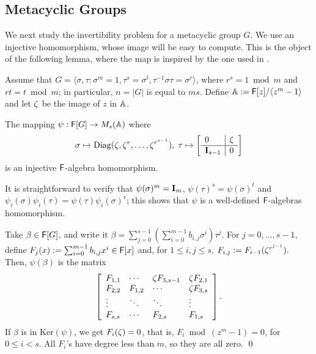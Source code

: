 \subsection{Metacyclic Groups}

We next study the invertibility problem for a
metacyclic group $G$. We use an injective homomorphism, whose image will
be easy to compute. This is the object of the following lemma, where
the map is inspired by the one used in \cite[\S 47]{Curtis}.

Assume that $G = \langle \sigma , \tau : \sigma^m = 1, \tau^s =
\sigma^t, \tau^{-1} \sigma \tau = \sigma^r \rangle$, where $r^s = 1
\bmod m$ and $rt = t \bmod m$; in particular, $n=|G|$ is equal to
$ms$. Define $\mathbb{A}:={\mathsf{F}}[z]/\langle z^m-1\rangle$ and let $\zeta$ be the
image of $z$ in $\mathbb{A}$.

\begin{lemma}\label{prop:metinjection}
The mapping $\psi: {\mathsf{F}} [G] \to M_s(\mathbb{A})$ where
\[
\sigma \mapsto \mathrm{Diag}(\zbar, \zbar^r , \ldots, \zbar^{r^{s-1}})
,\; \tau \mapsto 
\left[ \begin{array}{l|l}
0 & \zbar\\
\hline
\mat I_{s-1} & 0
\end{array}
\right]
\]
is an injective ${\mathsf{F}}$-algebra homomorphism.
\end{lemma}
It is straightforward to verify that $\psi(\sigma)^m = \mat I_m$,
$\psi(\tau)^s = \psi(\sigma)^t$ and $\psi_i(\sigma) \psi_i(\tau)
=\psi(\tau) \psi_i(\sigma)^r$; this shows that $\psi$ is a well-defined ${\mathsf{F}}$-algebras homomorphism.

Take $\beta \in {\mathsf{F}}[G]$, and write it $\beta = \sum_{j = 0}^{s-1}
\left( \sum_{i = 0}^{m-1} b_{i,j} \sigma^i \right) \tau^j$. For
$j=0,\dots,s-1$, define $F_j(x) := \sum_{i = 0}^{m-1} b_{i,j}x^i \in
{\mathsf{F}}[x]$ and, for $1 \leq i,j \leq s$,
$F_{i,j} := F_{i-1}(\zeta^{r^{j-1}}).$
Then, $\psi(\beta)$ is the matrix
\begin{equation}\label{eq:injection}
\left[\begin{array}{llll}
F_{1,1} &  \cdots	&	\zeta F_{3,s-1} & \zeta F_{2,1}\\
F_{2,2} & F_{1,2}& \cdots & \zeta F_{3,s}\\
\vdots &\ddots & \ddots& \vdots\\
F_{s,s}& \cdots & F_{2,s}	& F_{1,s}
\end{array}
\right].
\end{equation}
If $\beta$ is in $\mathrm{Ker}(\psi)$, we get $F_i(\zeta) =0$, that is,
$F_i \bmod (z^m-1)=0$, for $0 \leq i < s$.  All $F_i$'s have degree 
less than $m$, so they are all zero. \qed


